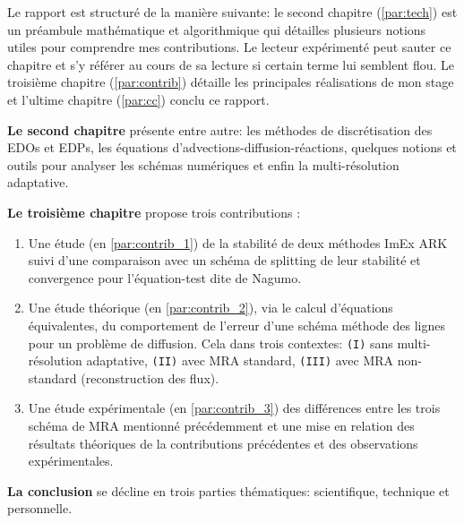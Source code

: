 Le rapport est structuré de la manière suivante: le second chapitre (\ref{par:tech}) est un préambule mathématique et algorithmique qui détailles plusieurs notions utiles 
pour comprendre mes contributions. Le lecteur expérimenté peut sauter ce chapitre et s'y référer au cours de sa lecture si certain terme lui semblent flou.
Le troisième chapitre (\ref{par:contrib}) détaille les principales réalisations de mon stage et l'ultime chapitre (\ref{par:cc}) conclu ce rapport.\par 
\textbf{Le second chapitre }présente entre autre: les méthodes de discrétisation des EDOs et EDPs, 
les équations d'advections-diffusion-réactions, 
quelques notions et outils pour analyser les schémas numériques
et enfin la multi-résolution adaptative.\par
\textbf{Le troisième chapitre } propose trois contributions :
\begin{enumerate}
    \item Une étude (en \ref{par:contrib_1}) de la stabilité de deux méthodes ImEx ARK suivi d'une comparaison avec un schéma de splitting de leur stabilité et convergence pour 
    l'équation-test dite de Nagumo.
    \item Une étude théorique (en \ref{par:contrib_2}), via le calcul d'équations équivalentes, du comportement de l'erreur d'une schéma méthode des lignes pour un problème de diffusion.
    Cela dans trois contextes: \texttt{(I)} sans multi-résolution adaptative, \texttt{(II)} avec MRA standard, \texttt{(III)} avec MRA non-standard (reconstruction des flux).
    \item Une étude expérimentale (en \ref{par:contrib_3}) des différences entre les trois schéma de MRA mentionné précédemment et une mise en relation des résultats théoriques de la contributions précédentes 
    et des observations expérimentales.
\end{enumerate}\par
\textbf{La conclusion } se décline en trois parties thématiques: scientifique, technique et personnelle.